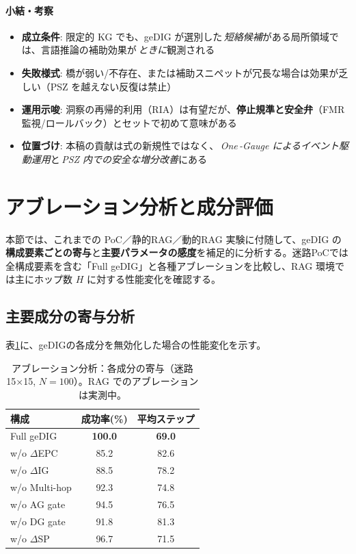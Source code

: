 \documentclass[ja=standard,xelatex]{bxjsarticle}
\begin{document}
\paragraph{小結・考察}
\begin{itemize}[leftmargin=*]
  \item \textbf{成立条件}: 限定的 KG でも、geDIG が選別した\,\emph{短絡候補}がある局所領域では、言語推論の補助効果が\,\emph{ときに}観測される
  \item \textbf{失敗様式}: 橋が弱い/不存在、または補助スニペットが冗長な場合は効果が乏しい（PSZ を越えない反復は禁止）
  \item \textbf{運用示唆}: 洞察の再帰的利用（RIA）は有望だが、\textbf{停止規準と安全弁}（FMR監視/ロールバック）とセットで初めて意味がある
  \item \textbf{位置づけ}: 本稿の貢献は式の新規性ではなく、\,\emph{One\,\mbox{-}Gauge によるイベント駆動運用}と\,\emph{PSZ 内での安全な増分改善}にある
\end{itemize}

\section{アブレーション分析と成分評価}
\label{sec:ablation_analysis}

本節では、これまでの PoC／静的RAG／動的RAG 実験に付随して、geDIG の\textbf{構成要素ごとの寄与}と\textbf{主要パラメータの感度}を補足的に分析する。迷路PoCでは全構成要素を含む「Full geDIG」と各種アブレーションを比較し、RAG 環境では主にホップ数 $H$ に対する性能変化を確認する。

\subsection{主要成分の寄与分析}

表\ref{tab:ablation}に、geDIGの各成分を無効化した場合の性能変化を示す。

\begin{table}[H]
\centering
\caption{アブレーション分析：各成分の寄与（迷路15×15, $N{=}100$）。RAG でのアブレーションは実測中。}
\label{tab:ablation}
\begin{tabular}{lcc}
\toprule
構成 & 成功率(\%) & 平均ステップ \\
\midrule
Full geDIG & \textbf{100.0} & \textbf{69.0} \\
w/o $\Delta$EPC & 85.2 & 82.6 \\
w/o $\Delta$IG & 88.5 & 78.2 \\
w/o Multi-hop & 92.3 & 74.8 \\
w/o AG gate & 94.5 & 76.5 \\
w/o DG gate & 91.8 & 81.3 \\
w/o $\Delta$SP & 96.7 & 71.5 \\
\bottomrule
\end{tabular}
\end{table}
\end{document}
